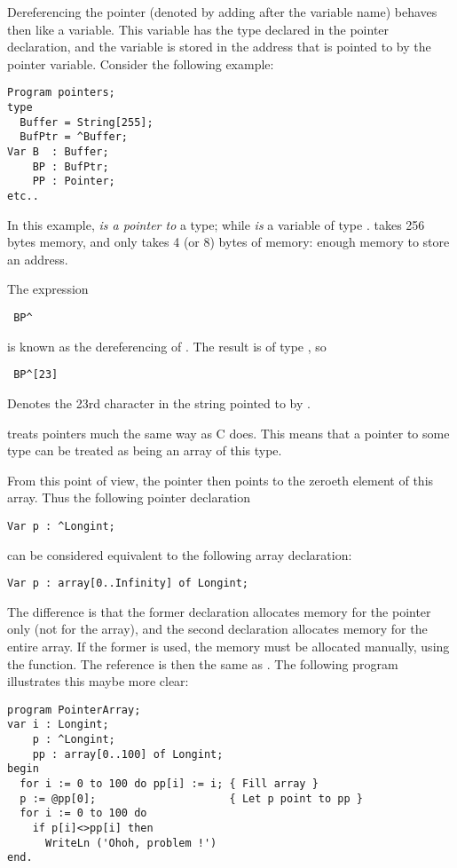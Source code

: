 Dereferencing the pointer (denoted by adding \var{\^{}} after the variable
name) behaves then like a variable. This variable has the type declared in
the pointer declaration, and the variable is stored in the address that is
pointed to by the pointer variable.
Consider the following example:
\begin{verbatim}
Program pointers;
type
  Buffer = String[255];
  BufPtr = ^Buffer;
Var B  : Buffer;
    BP : BufPtr;
    PP : Pointer;
etc..
\end{verbatim}
In this example,  {\em is a pointer to} a  type; while 
{\em is} a variable of type .  takes 256 bytes memory,
and  only takes 4 (or 8) bytes of memory: enough memory to store an
address.

The expression
\begin{verbatim}
 BP^
\end{verbatim}
is known as the dereferencing of . The result is of type , so
\begin{verbatim}
 BP^[23]
\end{verbatim}
Denotes the 23rd character in the string pointed to by .
\begin{remark} \fpc treats pointers much the same way as C does. This means
that a pointer to some type can be treated as being an array of this type.

From this point of view, the pointer then points to the zeroeth element of this array.
Thus the following pointer declaration
\begin{verbatim}
Var p : ^Longint;
\end{verbatim}
can be considered equivalent to the following array declaration:
\begin{verbatim}
Var p : array[0..Infinity] of Longint;
\end{verbatim}
The difference is that the former declaration allocates memory for the
pointer only (not for the array), and the second declaration allocates
memory for the entire array. If the former is used, the memory must be
allocated manually, using the  function.
The reference  is then the same as . The following program
illustrates this maybe more clear:
\begin{verbatim}
program PointerArray;
var i : Longint;
    p : ^Longint;
    pp : array[0..100] of Longint;
begin
  for i := 0 to 100 do pp[i] := i; { Fill array }
  p := @pp[0];                     { Let p point to pp }
  for i := 0 to 100 do
    if p[i]<>pp[i] then
      WriteLn ('Ohoh, problem !')
end.
\end{verbatim}
\end{remark}
